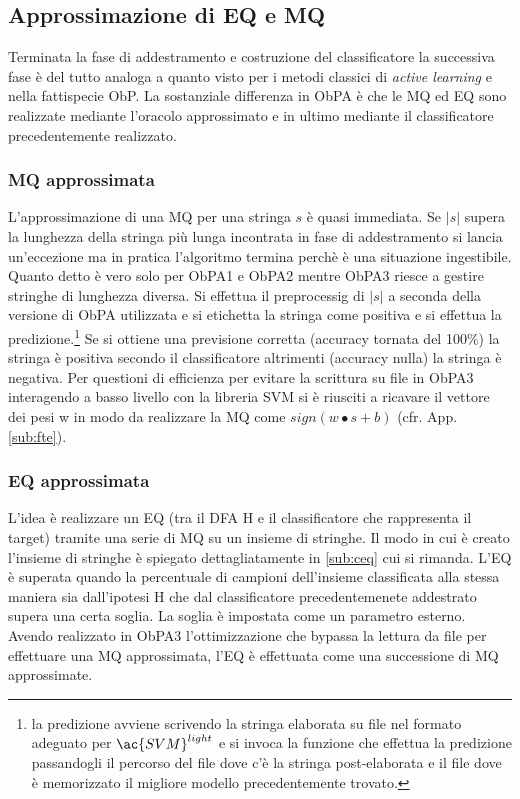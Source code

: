 \subsection{Approssimazione di EQ e MQ}
Terminata la fase di addestramento e costruzione del classificatore la successiva fase  è  del tutto analoga a quanto visto per i metodi classici di \textit{active learning} e nella fattispecie \ac{ObP}. La sostanziale differenza in \ac{ObPA} è che le \ac{MQ} ed \ac{EQ} sono realizzate mediante l'oracolo approssimato e in ultimo mediante il classificatore precedentemente realizzato.
\subsubsection{MQ approssimata}
L'approssimazione di una \ac{MQ} per una stringa $s$ è quasi immediata. Se $|s|$ supera la lunghezza della stringa più lunga incontrata in fase di addestramento si lancia un'eccezione ma in pratica l'algoritmo termina perchè è una situazione ingestibile. Quanto detto è vero solo per \ac{ObPA}1 e \ac{ObPA}2 mentre \ac{ObPA}3 riesce a gestire stringhe di lunghezza diversa. Si effettua il preprocessig di $|s|$ a seconda della versione di \ac{ObPA} utilizzata e si etichetta la stringa come positiva e si effettua la predizione.\footnote{la predizione avviene scrivendo la stringa elaborata su file nel formato adeguato per $\ac{SVM}^{light}$ e si invoca la funzione che effettua la predizione passandogli il percorso del file dove c'è la stringa post-elaborata e il file dove è memorizzato il migliore modello precedentemente trovato.} Se si ottiene una previsione corretta (accuracy tornata del 100$\%$) la stringa è positiva secondo il classificatore altrimenti (accuracy nulla) la stringa è negativa. Per questioni di efficienza per evitare la scrittura su file in \ac{ObPA}3 interagendo a basso livello con la libreria \ac{SVM} si è riusciti a ricavare il vettore dei pesi w in modo da realizzare la \ac{MQ} come $sign(w \bullet s + b)$ (cfr. App.  \ref{sub:fte}).
 
 \subsubsection{EQ approssimata}
 \label{subsub:eqa}
L'idea è realizzare un \ac{EQ} (tra il \ac{DFA} \ac{H} e il classificatore che rappresenta il target) tramite una serie di \ac{MQ} su un insieme di stringhe. Il modo in cui è creato l'insieme di stringhe è spiegato dettagliatamente in \ref{sub:ceq} cui si rimanda. L'\ac{EQ} è superata quando la percentuale di campioni dell'insieme  classificata alla stessa maniera sia dall'ipotesi \ac{H} che dal classificatore precedentemenete addestrato supera una certa soglia. La soglia è impostata come un parametro esterno. 
Avendo realizzato in \ac{ObPA}3 l'ottimizzazione che bypassa la lettura da file per effettuare una \ac{MQ} approssimata, l'\ac{EQ} è effettuata come una successione di \ac{MQ} approssimate.



